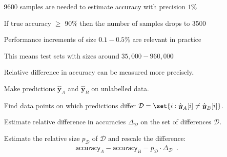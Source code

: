 \documentclass[landscape,footrule]{foils}
\renewcommand{\vec}[1]{\boldsymbol{#1}}
\begin{document}



\begin{triangles}
\item 9600 samples are needed to estimate accuracy with precision $1\%$
\item If true accuracy $\geq$ 90\% then the number of samples drops to 3500
\item Performance increments of size $0.1-0.5\%$ are relevant in practice
\item This means test sets with sizes around $35,000-960,000$ 
\end{triangles}




Relative difference in accuracy can be measured more precisely.
\begin{triangles}
\item Make predictions $\hat{\vec{y}}_A$ and $\hat{\vec{y}}_B$ on unlabelled data.
\item Find data points on which predictions differ $\mathcal{D}=\set{i: \hat{\vec{y}}_A[i]\neq \hat{\vec{y}}_B[i]}$.
\item Estimate relative difference in accuracies $\Delta_\mathcal{D}$ on the set of differences $\mathcal{D}$.
\item Estimate the relative size $p_\mathcal{D}$ of $\mathcal{D}$ and rescale the difference:
\begin{align*}
\mathsf{accuracy}_A-\mathsf{accuracy}_B= p_\mathcal{D}\cdot \Delta_\mathcal{D}\enspace.
\end{align*}  
\end{triangles}

\end{document}
